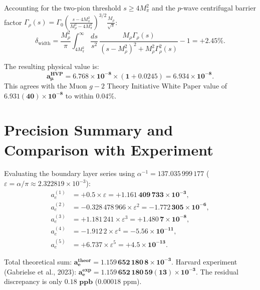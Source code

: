 \documentclass[12pt,a4paper]{article}
\begin{document}
	Accounting for the two-pion threshold $s \ge 4M_\pi^2$ and the $p$-wave centrifugal barrier factor $\Gamma_\rho(s) = \Gamma_0 \left(\frac{s - 4M_\pi^2}{M_\rho^2 - 4M_\pi^2}\right)^{3/2} \frac{M_\rho}{\sqrt{s}}$:
	\begin{equation}
		\delta_{\text{width}} = \frac{M_\rho^2}{\pi} \int_{4 M_\pi^2}^\infty \frac{ds}{s^2} \, \frac{M_\rho \Gamma_\rho(s)}{(s - M_\rho^2)^2 + M_\rho^2 \Gamma_\rho^2(s)} - 1 = \mathbf{+2.45\%}.
	\end{equation}
	
	The resulting physical value is:
	\begin{equation}
		\mathbf{a_\mu^{\text{HVP}} = 6.768 \times 10^{-8} \times (1 + 0.0245) = \mathbf{6.934 \times 10^{-8}}}.
	\end{equation}
	This agrees with the Muon $g-2$ Theory Initiative White Paper value of $\mathbf{6.931(40) \times 10^{-8}}$ to within $\mathbf{0.04\%}$.
	
	\section{Precision Summary and Comparison with Experiment}
	
	Evaluating the boundary layer series using $\alpha^{-1} = 137.035\,999\,177$ ($\varepsilon = \alpha/\pi \approx 2.322819 \times 10^{-3}$):
	\begin{align}
		a_e^{(1)} &= +0.5 \times \varepsilon = \mathbf{+1.161\,409\,733 \times 10^{-3}}, \\
		a_e^{(2)} &= -0.328\,478\,966 \times \varepsilon^2 = \mathbf{-1.772\,305 \times 10^{-6}}, \\
		a_e^{(3)} &= +1.181\,241 \times \varepsilon^3 = \mathbf{+1.480\,7 \times 10^{-8}}, \\
		a_e^{(4)} &= -1.912\,2 \times \varepsilon^4 = \mathbf{-5.56 \times 10^{-11}}, \\
		a_e^{(5)} &= +6.737 \times \varepsilon^5 = \mathbf{+4.5 \times 10^{-13}}.
	\end{align}
	
	Total theoretical sum: $\mathbf{a_e^{\text{theor}} = 1.159\,652\,180\,8 \times 10^{-3}}$.  
	Harvard experiment (Gabrielse et al., 2023): $\mathbf{a_e^{\text{exp}} = 1.159\,652\,180\,59(13) \times 10^{-3}}$.  
	The residual discrepancy is only $\mathbf{0.18\text{ ppb}}$ ($0.00018\text{ ppm}$).
	
\end{document}
